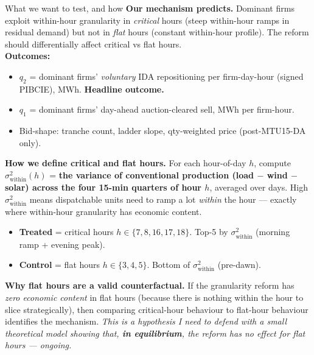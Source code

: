 \documentclass[10pt,aspectratio=169]{beamer}
\begin{document}
\begin{frame}{What we want to test, and how}
  \footnotesize
  \textbf{Our mechanism predicts.} Dominant firms exploit within-hour granularity in \emph{critical} hours (steep within-hour ramps in residual demand) but not in \emph{flat} hours (constant within-hour profile). The reform should differentially affect critical vs flat hours.\\[4pt]
  \textbf{Outcomes:}
  \begin{itemize}
    \item $q_2$ = dominant firms' \emph{voluntary} IDA repositioning per firm-day-hour (signed PIBCIE), MWh. \textbf{Headline outcome.}
    \item $q_1$ = dominant firms' day-ahead auction-cleared sell, MWh per firm-hour.
    \item Bid-shape: tranche count, ladder slope, qty-weighted price (post-MTU15-DA only).
  \end{itemize}
  \textbf{How we define critical and flat hours.} For each hour-of-day $h$, compute $\sigma^2_{\text{within}}(h)$ = \textbf{the variance of conventional production (load $-$ wind $-$ solar) across the four 15-min quarters of hour $h$}, averaged over days. High $\sigma^2_{\text{within}}$ means dispatchable units need to ramp a lot \emph{within} the hour --- exactly where within-hour granularity has economic content.
  \begin{itemize}
    \item \textbf{Treated} = critical hours $h\in\{7,8,16,17,18\}$. Top-5 by $\sigma^2_{\text{within}}$ (morning ramp + evening peak).
    \item \textbf{Control} = flat hours $h\in\{3,4,5\}$. Bottom of $\sigma^2_{\text{within}}$ (pre-dawn).
  \end{itemize}
  \textbf{Why flat hours are a valid counterfactual.} If the granularity reform has \emph{zero economic content} in flat hours (because there is nothing within the hour to slice strategically), then comparing critical-hour behaviour to flat-hour behaviour identifies the mechanism. \emph{This is a hypothesis I need to defend with a small theoretical model showing that, \textbf{in equilibrium}, the reform has no effect for flat hours --- ongoing.}
\end{frame}
\end{document}
